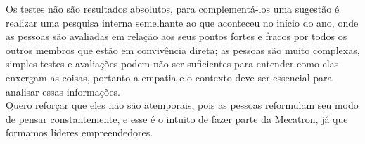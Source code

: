 \documentclass[a4paper, 12pt]{article}
\begin{document}
Os testes não são resultados absolutos, para complementá-los uma sugestão é realizar uma pesquisa interna semelhante ao que aconteceu no início do ano, onde as pessoas são avaliadas em relação aos seus pontos fortes e fracos por todos os outros membros que estão em convivência direta; as pessoas são muito complexas, simples testes e avaliações podem não ser suficientes para entender como elas enxergam as coisas, portanto a empatia e o contexto deve ser essencial para analisar essas informações.\\

Quero reforçar que eles não são atemporais, pois as pessoas reformulam seu modo de pensar constantemente, e esse é o intuito de fazer parte da Mecatron, já que formamos líderes empreendedores. 



	
	
\end{document}
